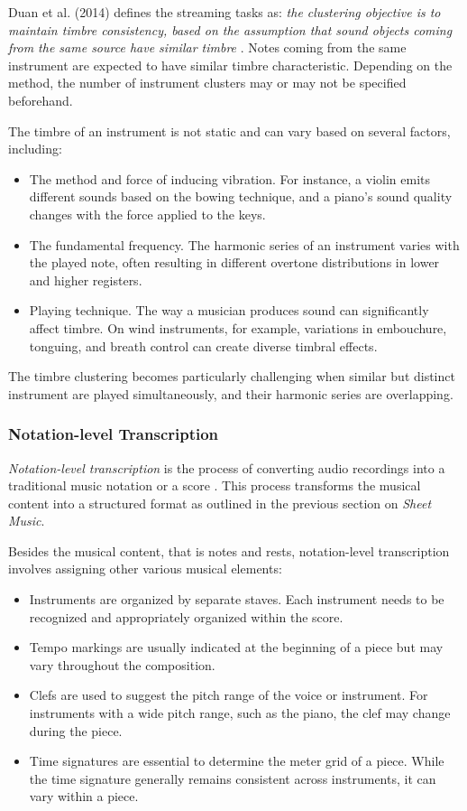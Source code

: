Duan et al. (2014) defines the streaming tasks as: \emph{the clustering objective is to maintain timbre consistency, based on the assumption that sound objects coming from the same source have similar timbre} \cite{Duan2014}. Notes coming from the same instrument are expected to have similar timbre characteristic. Depending on the method, the number of instrument clusters may or may not be specified beforehand.

The timbre of an instrument is not static and can vary based on several factors, including:
\begin{itemize}
	\item The method and force of inducing vibration. For instance, a violin emits different sounds based on the bowing technique, and a piano's sound quality changes with the force applied to the keys.
	\item The fundamental frequency. The harmonic series of an instrument varies with the played note, often resulting in different overtone distributions in lower and higher registers.
	\item Playing technique. The way a musician produces sound can significantly affect timbre. On wind instruments, for example, variations in embouchure, tonguing, and breath control can create diverse timbral effects.
\end{itemize}

The timbre clustering becomes particularly challenging when similar but distinct instrument are played simultaneously, and their harmonic series are overlapping.

\subsubsection{Notation-level Transcription}

\emph{Notation-level transcription} is the process of converting audio recordings into a traditional music notation or a score \cite{Bhattarai2023}. This process transforms the musical content into a structured format as outlined in the previous section on \emph{Sheet Music}.

Besides the musical content, that is notes and rests, notation-level transcription involves assigning other various musical elements:
\begin{itemize}
	\item Instruments are organized by separate staves. Each instrument needs to be recognized and appropriately organized within the score.
	\item Tempo markings are usually indicated at the beginning of a piece but may vary throughout the composition.
	\item Clefs are used to suggest the pitch range of the voice or instrument. For instruments with a wide pitch range, such as the piano, the clef may change during the piece.
	\item Time signatures are essential to determine the meter grid of a piece. While the time signature generally remains consistent across instruments, it can vary within a piece.
\end{itemize}

